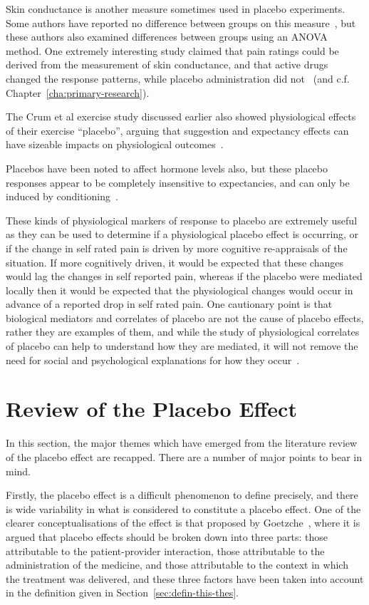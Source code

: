 Skin conductance is another measure sometimes used in placebo experiments. Some authors have reported no difference between groups on this measure~\cite{Flaten1999}, but these authors also examined differences between groups using an ANOVA method. One extremely interesting study claimed that pain ratings could be derived from the measurement of skin conductance, and that active drugs changed the response patterns, while placebo administration did not~\cite{Fujita2000} (and c.f. Chapter~\ref{cha:primary-research}).

The Crum et al exercise study discussed earlier also showed physiological effects of their exercise ``placebo'', arguing that suggestion and expectancy effects can have sizeable impacts on physiological outcomes~\cite{Crum2007}.

Placebos have been noted to affect hormone levels also, but these placebo responses appear to be completely insensitive to expectancies, and can only be induced by conditioning~\cite{benedetti2003a}. 

These kinds of physiological markers of response to placebo are extremely useful as they can be used to determine if a physiological placebo effect is occurring, or if the change in self rated pain is driven by more cognitive re-appraisals of the situation. If more cognitively driven, it would be expected that these changes would lag the changes in self reported pain, whereas if the placebo were mediated locally then it would be expected that the physiological changes would occur in advance of a reported drop in self rated pain. One cautionary point is that biological mediators and correlates of placebo are not the cause of placebo effects, rather they are examples of them, and while the study of physiological correlates of placebo can help to understand how they are mediated, it will not remove the need for social and psychological explanations for how they occur~\cite{Stewart-Williams2004b}. 


\section{Review of the Placebo Effect}
\label{sec:revi-plac-effect}

In this section, the major themes which have emerged from the literature review of the placebo effect are recapped. There are a number of major points to bear in mind. 

Firstly, the placebo effect is a difficult phenomenon to define precisely, and there is wide variability in what is considered to constitute a placebo effect. One of the clearer conceptualisations of the effect is that proposed by Goetzche~\cite{Gotzsche1995}, where it is argued that placebo effects should be broken down into three parts: those attributable to the patient-provider interaction, those attributable to the administration of the medicine, and those attributable to the context in which the treatment was delivered, and these three factors have been taken into account in the definition given in Section~\ref{sec:defin-this-thes}. 

